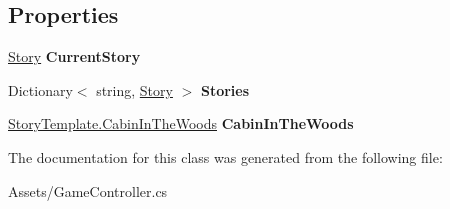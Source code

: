 \subsection*{Properties}
\begin{DoxyCompactItemize}
\item 
\hyperlink{classAssets_1_1Story}{Story} {\bfseries Current\+Story}\hypertarget{classAssets_1_1GameController_a8aa889de1e941a13fe8f4789ab05887e}{}\label{classAssets_1_1GameController_a8aa889de1e941a13fe8f4789ab05887e}

\item 
Dictionary$<$ string, \hyperlink{classAssets_1_1Story}{Story} $>$ {\bfseries Stories}\hypertarget{classAssets_1_1GameController_af0b44b09b387f7249b1211e390ef9c5b}{}\label{classAssets_1_1GameController_af0b44b09b387f7249b1211e390ef9c5b}

\item 
\hyperlink{classAssets_1_1StoryTemplate_1_1CabinInTheWoods}{Story\+Template.\+Cabin\+In\+The\+Woods} {\bfseries Cabin\+In\+The\+Woods}\hypertarget{classAssets_1_1GameController_ad845346d942b924a73e932170a1613a1}{}\label{classAssets_1_1GameController_ad845346d942b924a73e932170a1613a1}

\end{DoxyCompactItemize}


The documentation for this class was generated from the following file\+:\begin{DoxyCompactItemize}
\item 
Assets/Game\+Controller.\+cs\end{DoxyCompactItemize}
